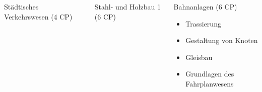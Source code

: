 \documentclass[slidestop,compress,mathserif, aspectratio = 169, 9pt]{beamer}
\begin{document}
{ \begin{columns}[t] 
     \begin{column}[T]{4.5cm} 
     St\"adtisches Verkehrswesen (4 CP)
     \end{column}
     	\begin{column}[T]{4.5cm} 
	Stahl- und Holzbau 1 (6 CP)
     \end{column}
     \begin{column}[T]{4.5cm} 
     Bahnanlagen (6 CP)
     	\begin{itemize}
     	\item Trassierung
     	\item Gestaltung von Knoten
     	\item Gleisbau
     	\item Grundlagen des Fahrplanwesens
     	\end{itemize}
     \end{column}
 \end{columns}

}

\end{document}
